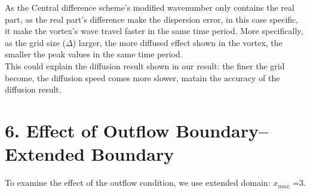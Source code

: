 \documentclass[12pt]{article}
\begin{document}
As the Central difference scheme's modified wavenumber only 
contains the real part, as the real part's difference make the
dispersion error, in this case specific, it make the vortex's 
wave travel faster in the same time period. More specifically, as the grid size ($\Delta$) larger, the
more diffused effect shown in the vortex, the smaller the 
peak values in the same time period.\\

This could explain the diffusion result shown in our result:
the finer the grid become, the diffusion speed comes more 
slower, matain the accuracy of the diffusion result. 

















\section{6. Effect of Outflow Boundary--Extended Boundary}

To examine the effect of the outflow condition, we use extended
domain: $x_{max}$ =3.\\








\end{document}
